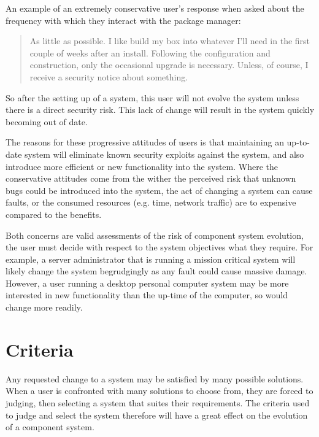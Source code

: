 An example of an extremely conservative user's response when asked about the frequency with which they interact with the package manager:
\begin{quotation}
As little as possible. I like build my box into whatever I'll need in the first couple of weeks after an install. 
Following the configuration and construction, only the occasional upgrade is necessary. 
Unless, of course, I receive a security notice about something.
\end{quotation}
So after the setting up of a system, this user will not evolve the system unless there is a direct security risk.
This lack of change will result in the system quickly becoming out of date.

The reasons for these progressive attitudes of users is that maintaining an up-to-date system will eliminate known security exploits against the system,
and also introduce more efficient or new functionality into the system.
Where the conservative attitudes come from the wither the perceived risk that unknown bugs could be introduced into the system, the act of changing a system can cause faults,
or the consumed resources (e.g. time, network traffic) are to expensive compared to the benefits.

Both concerns are valid assessments of the risk of component system evolution, the user must decide with respect to the system objectives what they require. 
For example, a server administrator that is running a mission critical system will likely change the system begrudgingly as any fault could cause massive damage.
However, a user running a desktop personal computer system may be more interested in new functionality than the up-time of the computer, so would change more readily.

\section{Criteria}
Any requested change to a system may be satisfied by many possible solutions.
When a user is confronted with many solutions to choose from, they are forced to judging, then selecting a system that suites their requirements.
The criteria used to judge and select the system therefore will have a great effect on the evolution of a component system.

